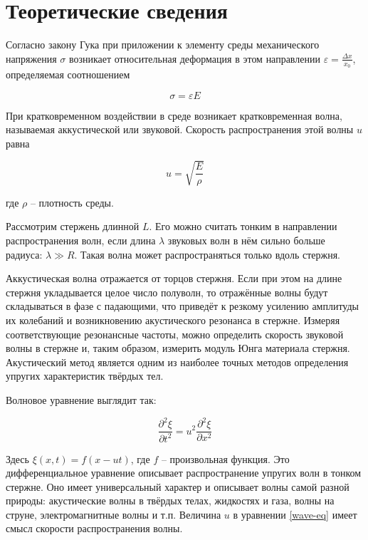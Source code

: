 \documentclass[a4paper,12pt]{article}
\begin{document}
\section{Теоретические сведения}

Согласно закону Гука при приложении к элементу среды механического напряжения $\sigma$ возникает относительная деформация в этом направлении $\varepsilon = \frac{\Delta x}{x_0}$, определяемая соотношением

\begin{equation}\label{law}
    \sigma = \varepsilon E
\end{equation}

При кратковременном воздействии в среде возникает кратковременная волна, называемая аккустической или звуковой. Скорость распространения этой волны $u$ равна

\begin{equation}\label{e-u-rho}
    u = \sqrt{\frac{E}{\rho}}
\end{equation}

где $\rho$ -- плотность среды.

Рассмотрим стержень длинной $L$. Его можно считать тонким в направлении распространения волн, если длина $\lambda$ звуковых волн в нём сильно больше радиуса: $\lambda \gg R$. Такая волна может распространяться только вдоль стержня.

Аккустическая волна отражается от торцов стержня. Если при этом на длине стержня укладывается целое число полуволн, то отражённые волны будут складываться в фазе с падающими, что приведёт к резкому усилению амплитуды их колебаний и возникновению акустического резонанса в стержне. Измеряя соответствующие резонансные частоты, можно определить скорость звуковой волны в стержне и, таким образом, измерить модуль Юнга материала стержня. Акустический метод является одним из наиболее точных методов определения упругих характеристик твёрдых тел.

Волновое уравнение выглядит так:

\begin{equation}\label{wave-eq}
    \frac{\partial^2 \xi}{\partial t^2} = u^2 \frac{\partial^2 \xi}{\partial x^2}
\end{equation}

Здесь $\xi(x, t) = f(x - ut)$, где $f$ -- произвольная функция. Это дифференциальное уравнение описывает распространение упругих волн в тонком стержне. Оно имеет универсальный характер и описывает волны самой разной природы: акустические волны в твёрдых телах, жидкостях и газа, волны на струне, электромагнитные волны и т.п. Величина $u$ в уравнении \eqref{wave-eq} имеет смысл скорости распространения волны.
\end{document}
